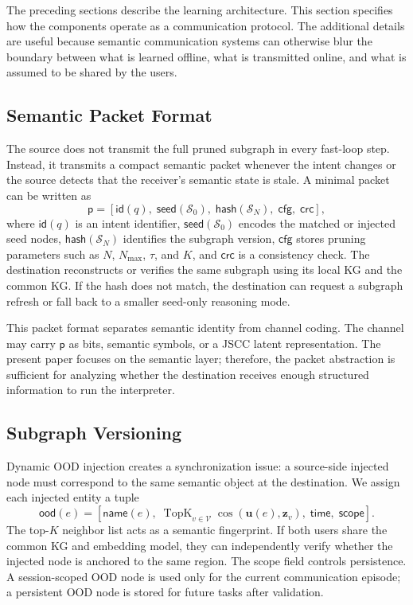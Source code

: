 \documentclass[journal]{IEEEtran}
\newcommand{\SG}{\mathcal{S}}
\newcommand{\calS}{\mathcal{S}}
\newcommand{\calV}{\mathcal{V}}
\begin{document}
The preceding sections describe the learning architecture. This section specifies how the components operate as a communication protocol. The additional details are useful because semantic communication systems can otherwise blur the boundary between what is learned offline, what is transmitted online, and what is assumed to be shared by the users.

\subsection{Semantic Packet Format}

The source does not transmit the full pruned subgraph in every fast-loop step. Instead, it transmits a compact semantic packet whenever the intent changes or the source detects that the receiver's semantic state is stale. A minimal packet can be written as
\begin{equation}
\mathsf{p}=
\left[
\mathsf{id}(q),\;
\mathsf{seed}(\calS_0),\;
\mathsf{hash}(\SG_N),\;
\mathsf{cfg},\;
\mathsf{crc}
\right],
\label{eq:packet}
\end{equation}
where $\mathsf{id}(q)$ is an intent identifier, $\mathsf{seed}(\calS_0)$ encodes the matched or injected seed nodes, $\mathsf{hash}(\SG_N)$ identifies the subgraph version, $\mathsf{cfg}$ stores pruning parameters such as $N$, $N_{\max}$, $\tau$, and $K$, and $\mathsf{crc}$ is a consistency check. The destination reconstructs or verifies the same subgraph using its local KG and the common KG. If the hash does not match, the destination can request a subgraph refresh or fall back to a smaller seed-only reasoning mode.

This packet format separates semantic identity from channel coding. The channel may carry $\mathsf{p}$ as bits, semantic symbols, or a JSCC latent representation. The present paper focuses on the semantic layer; therefore, the packet abstraction is sufficient for analyzing whether the destination receives enough structured information to run the interpreter.

\subsection{Subgraph Versioning}

Dynamic OOD injection creates a synchronization issue: a source-side injected node must correspond to the same semantic object at the destination. We assign each injected entity a tuple
\begin{equation}
\mathsf{ood}(e)=
\left[
\mathsf{name}(e),\;
\operatorname{TopK}_{v\in\calV}\cos(\mathbf{u}(e),\mathbf{z}_v),\;
\mathsf{time},\;
\mathsf{scope}
\right].
\end{equation}
The top-$K$ neighbor list acts as a semantic fingerprint. If both users share the common KG and embedding model, they can independently verify whether the injected node is anchored to the same region. The scope field controls persistence. A session-scoped OOD node is used only for the current communication episode; a persistent OOD node is stored for future tasks after validation.
\end{document}
